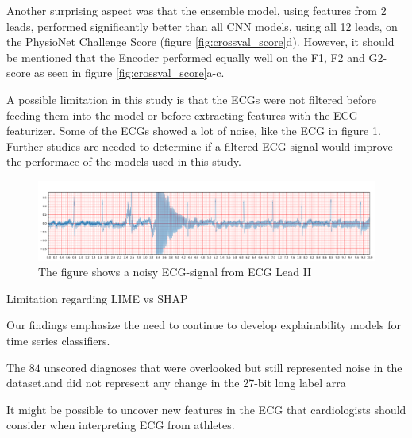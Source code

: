Another surprising aspect was that the ensemble model, using features from 2 leads, performed significantly better than all CNN models, using all 12 leads, on the PhysioNet Challenge Score (figure \ref{fig:crossval_score}d). However, it should be mentioned that the Encoder performed equally well on the F1, F2 and G2-score as seen in figure \ref{fig:crossval_score}a-c.

A possible limitation in this study is that the ECGs were not filtered before feeding them into the model or before extracting features with the ECG-featurizer. Some of the ECGs showed a lot of noise, like the ECG in figure \ref{fig:noisy_leadII}. Further studies are needed to determine if a filtered ECG signal would improve the performace of the models used in this study.

\begin{figure}[!hbp]
    \centering
    \includegraphics[width=.90\textwidth]{Figures/noisy_leadII.png}
    \caption{The figure shows a noisy ECG-signal from ECG Lead II}
    \label{fig:noisy_leadII}
\end{figure}


Limitation regarding LIME vs SHAP

Our findings emphasize the need to continue to develop explainability models for time series classifiers. 



The $84$ unscored diagnoses that were overlooked but still represented noise in the dataset.and did not represent any change in the 27-bit long label arra

It might be possible to uncover new features in the ECG that cardiologists should consider when interpreting ECG from athletes.